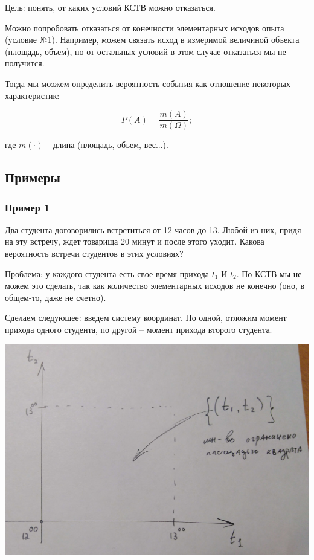 \documentclass{article}
\begin{document}
Цель: понять, от каких условий КСТВ можно отказаться.

Можно попробовать отказаться от конечности элементарных исходов опыта (условие №1). Например, можем связать исход в измеримой величиной объекта (площадь, объем), но от остальных условий в этом случае отказаться мы не получится.

Тогда мы моэжем определить вероятность события как отношение некоторых характеристик:

$$ P(A) = \frac{m(A)}{m(\Omega)};$$

где $m(\cdot)$ -- длина (площадь, объем, вес...).

\subsection{Примеры}
\subsubsection{Пример 1}

Два студента договорились встретиться от 12 часов до 13. Любой из них, придя на эту встречу, ждет товарища 20 минут и после этого уходит. Какова вероятность встречи студентов в этих условиях?

Проблема: у каждого студента есть свое время прихода $t_1$ И $t_2$. По КСТВ мы не можем это сделать, так как количество элементарных исходов не конечно (оно, в общем-то, даже не счетно).

Сделаем следующее: введем систему координат. По одной, отложим момент прихода одного студента, по другой -- момент прихода второго студента.

\begin{center}
    \includegraphics[scale=0.16]{1_1.jpg}
\end{center}
\end{document}
